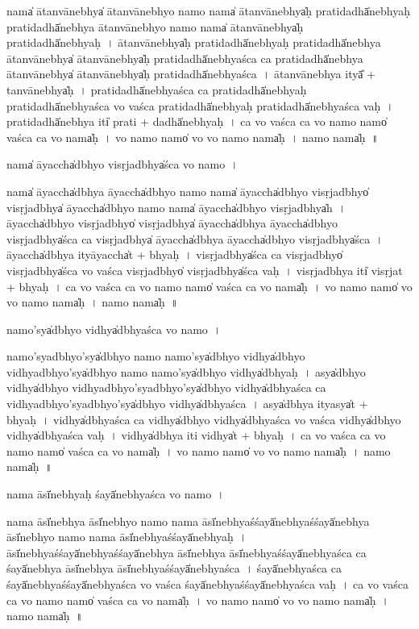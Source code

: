 \documentclass[parskip, DIV=14]{scrartcl}
\begin{document}
{nama̍ ātanvā॒nebhya̍ ātanvā॒nebhyo॒ namo॒ nama̍ ātanvā॒nebhya̍ḥ prati॒dadhā̍nebhyaḥ prati॒dadhā̍nebhya ātanvā॒nebhyo॒ namo॒ nama̍ ātanvā॒nebhya̍ḥ prati॒dadhā̍nebhyaḥ~।
ā॒ta॒nvā॒nebhya̍ḥ prati॒dadhā̍nebhyaḥ prati॒dadhā̍nebhya ātanvā॒nebhya̍ ātanvā॒nebhya̍ḥ prati॒dadhā̍nebhyaśca ca prati॒dadhā̍nebhya ātanvā॒nebhya̍ ātanvā॒nebhya̍ḥ prati॒dadhā̍nebhyaśca~।
ā॒ta॒nvā॒nebhya॒ ityā̎ + ta॒nvā॒nebhya̍ḥ~।
pra॒ti॒dadhā̍nebhyaśca ca prati॒dadhā̍nebhyaḥ prati॒dadhā̍nebhyaśca vo vaśca prati॒dadhā̍nebhyaḥ prati॒dadhā̍nebhyaśca vaḥ~।
pra॒ti॒dadhā̍nebhya॒ iti̍ prati + dadhā̍nebhyaḥ~।
ca॒ vo॒ va॒śca॒ ca॒ vo॒ namo॒ namo̍ vaśca ca vo॒ nama̍ḥ~।
vo॒ namo॒ namo̍ vo vo॒ namo॒ nama̍ḥ~।
namo॒ nama̍ḥ~॥ 


nama̍ ā॒yaccha̍dbhyo visṛ॒jadbhya̍śca vo॒ namo~।

nama̍ ā॒yaccha̍dbhya ā॒yaccha̍dbhyo॒ namo॒ nama̍ ā॒yaccha̍dbhyo visṛ॒jadbhyo̍ visṛ॒jadbhya̍ ā॒yaccha̍dbhyo॒ namo॒ nama̍ ā॒yaccha̍dbhyo visṛ॒jadbhya̍h~।
ā॒yaccha̍dbhyo visṛ॒jadbhyo̍ visṛ॒jadbhya̍ ā॒yaccha̍dbhya ā॒yaccha̍dbhyo visṛ॒jadbhya̍śca ca visṛ॒jadbhya̍ ā॒yaccha̍dbhya ā॒yaccha̍dbhyo visṛ॒jadbhya̍śca~।
ā॒yaccha̍dbhya॒ ityā॒yaccha̍t + bhya॒ḥ~।
vi॒sṛ॒jadbhya̍śca ca visṛ॒jadbhyo̍ visṛ॒jadbhya̍śca vo vaśca visṛ॒jadbhyo̍ visṛ॒jadbhya̍śca vaḥ~।
vi॒sṛ॒jadbhya॒ iti̍ visṛ॒jat + bhya॒ḥ~।
ca॒ vo॒ va॒śca॒ ca॒ vo॒ namo॒ namo̍ vaśca ca vo॒ nama̍ḥ~।
vo॒ namo॒ namo̍ vo vo॒ namo॒ nama̍ḥ~।
namo॒ nama̍ḥ~॥ 

namo'sya̍dbhyo॒ vidhya̍dbhyaśca vo॒ namo~।

namo'sya॒dbhyo'sya̍dbhyo॒ namo॒ namo'sya̍dbhyo॒ vidhya̍dbhyo॒ vidhya॒dbhyo'sya̍dbhyo॒ namo॒ namo'sya̍dbhyo॒ vidhya̍dbhyaḥ~।
asya̍dbhyo॒ vidhya̍dbhyo॒ vidhya॒dbhyo'sya॒dbhyo'sya̍dbhyo॒ vidhya̍dbhyaśca ca॒ vidhya॒dbhyo'sya॒dbhyo'sya̍dbhyo॒ vidhya̍dbhyaśca~।
asya̍dbhya॒ ityasya̍t + bhya॒ḥ~।
vidhya̍dbhyaśca ca॒ vidhya̍dbhyo॒ vidhya̍dbhyaśca vo vaśca॒ vidhya̍dbhyo॒ vidhya̍dbhyaśca vaḥ~।
vidhya̍dbhya॒ iti॒ vidhya̍t + bhya॒ḥ~।
ca॒ vo॒ va॒śca॒ ca॒ vo॒ namo॒ namo̍ vaśca ca vo॒ nama̍ḥ~।
vo॒ namo॒ namo̍ vo vo॒ namo॒ nama̍ḥ~।
namo॒ nama̍ḥ~॥ 

nama॒ āsī̍nebhya॒ḥ śayā̍nebhyaśca vo॒ namo~।

nama॒ āsī̍nebhya॒ āsī̍nebhyo॒ namo॒ nama॒ āsī̍nebhya॒śśayā̍nebhya॒śśayā̍nebhya॒ āsī̍nebhyo॒ namo॒ nama॒ āsī̍nebhya॒śśayā̍nebhyaḥ~।
āsī̍nebhya॒śśayā̍nebhya॒śśayā̍nebhya॒ āsī̍nebhya॒ āsī̍nebhya॒śśayā̍nebhyaśca ca॒ śayā̍nebhya॒ āsī̍nebhya॒ āsī̍nebhya॒śśayā̍nebhyaśca~।
śayā̍nebhyaśca ca॒ śayā̍nebhya॒śśayā̍nebhyaśca vo vaśca॒ śayā̍nebhya॒śśayā̍nebhyaśca vaḥ~।
ca॒ vo॒ va॒śca॒ ca॒ vo॒ namo॒ namo̍ vaśca ca vo॒ nama̍ḥ~।
vo॒ namo॒ namo̍ vo vo॒ namo॒ nama̍ḥ~।
namo॒ nama̍ḥ~॥ 

}
\end{document}
